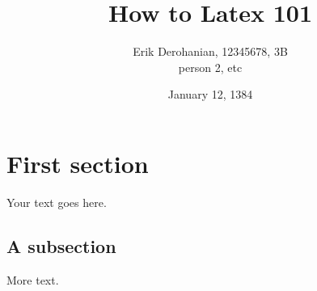 \documentclass[twoside, 12pt]{report}
\title{How to Latex 101}
\author{Erik Derohanian, 12345678, 3B \\ person 2, etc}
\date{January 12, 1384}
\begin{document}
\maketitle

\section{First section}

Your text goes here.

\subsection{A subsection}

More text.
\end{document}
